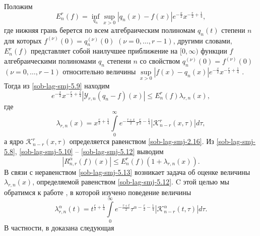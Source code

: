 Положим
\begin{equation}\label{sob-lag-smj-5.10}
  E_n^r(f)=\inf\limits_{q_n}\sup\limits_{x>0}|q_n(x)-f(x)|e^{-\frac x2}
  x^{-\frac r2+\frac14},
\end{equation}
где нижняя грань берется по всем алгебраическим полиномам $q_n(t)$ степени $n$ для которых $f^{(\nu)}(0)=q_n^{(\nu)}(0)$ $(\nu=0,\ldots,r-1)$, другими словами, $E_n^r(f)$ представляет собой наилучшее приближение на $[0,\infty)$ функции $f$ алгебраическими полиномами $q_n$   степени $n$ со свойством $q_n^{(\nu)}(0)=f^{(\nu)}(0)$ $(\nu=0,\ldots,r-1)$ относительно величины $\sup\limits_{x>0}|f(x)-q_n(x)|e^{-\frac x2}x^{-\frac r2+\frac14}$ . Тогда из \eqref{sob-lag-smj-5.9} находим
\begin{equation}\label{sob-lag-smj-5.11}
 e^{-\frac{x}{2}} x^{-\frac r2+\frac14}|\mathcal{Y}_{r,n}(q_n-f)(x)|\le E_n^r(f)\lambda_{r,n}(x),
\end{equation}
где
\begin{equation}\label{sob-lag-smj-5.12}
  \lambda_{r,n}(x)=x^{\frac r2+\frac14}\int\limits_0^\infty e^{-\frac{\tau+x}2}\tau^{\frac r2-\frac14}|\mathcal{K}_{n-r}^r(x,\tau)|d\tau,
\end{equation}
а ядро $\mathcal{K}_{n-r}^r(x,\tau)$ определяется равенством \eqref{sob-lag-smj-2.16}.
Из \eqref{sob-lag-smj-5.8}, \eqref{sob-lag-smj-5.10} -- \eqref{sob-lag-smj-5.12} выводим
\begin{equation}\label{sob-lag-smj-5.13}
  |R_{n,r}^\alpha(f)(x)|\le E_n^r(f)(1+\lambda_{r,n}(x)).
\end{equation}
В связи с неравенством \eqref{sob-lag-smj-5.13} возникает задача об оценке величины $\lambda_{r,n}(x)$, определяемой равенством \eqref{sob-lag-smj-5.12}.  C этой целью мы обратимся к работе \cite{sob-leg-SHII}, в которой изучено поведение величины
\begin{equation*}
  \lambda_{r,n}^\alpha(t)=t^{\frac r2+\frac14}\int\limits_0^\infty e^{-\frac{\tau+t}2}\tau^{\alpha-\frac r2-\frac14}|\mathcal{K}_{n-r}^\alpha(t,\tau)|d\tau.
\end{equation*}
В частности, в \cite{sob-leg-SHII} доказана следующая

